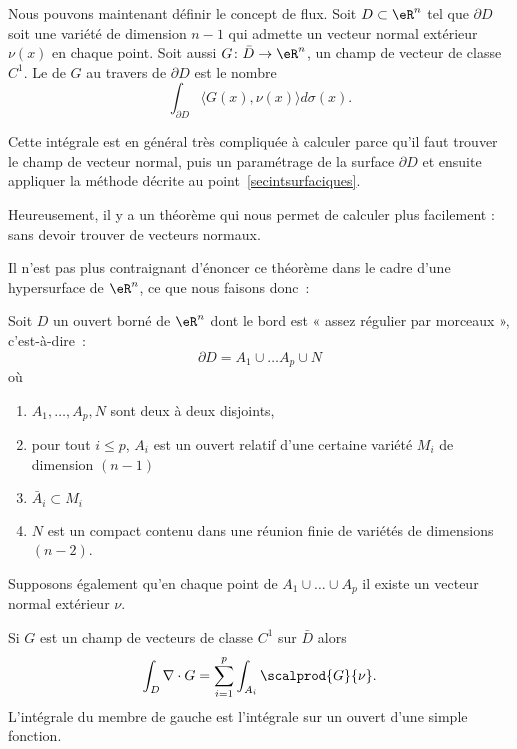 Nous pouvons maintenant définir le concept de flux. Soit \( D\subset \eR^n\) tel que \( \partial D\) soit une variété de dimension \( n-1\) qui admette un vecteur normal extérieur \( \nu(x)\) en chaque point. Soit aussi \( G\colon \bar D\to \eR^n\), un champ de vecteur de classe \( C^1\). Le  de \( G\) au travers de \( \partial D\) est le nombre
\begin{equation}
	\int_{\partial D}\langle G(x), \nu(x)\rangle d\sigma(x).
\end{equation}

Cette intégrale est en général très compliquée à calculer parce qu'il faut trouver le champ de vecteur normal, puis un paramétrage de la surface \( \partial D\) et ensuite appliquer la méthode décrite au point~\ref{secintsurfaciques}.

Heureusement, il y a un théorème qui nous permet de calculer plus facilement : sans devoir trouver de vecteurs normaux.

Il n'est pas plus contraignant d'énoncer ce théorème dans le cadre d'une hypersurface de \( \eR^n\), ce que nous faisons donc~:
\begin{theorem}
	Soit \( D\) un ouvert borné de \( \eR^n\) dont le bord est « assez régulier par morceaux », c'est-à-dire~:
	\begin{equation}
		\partial D = A_1 \cup \ldots A_p \cup N
	\end{equation}
	où
	\begin{enumerate}
		\item \( A_1, \ldots, A_p, N\) sont deux à deux disjoints,
		\item pour tout \( i \leq p\), \( A_i\) est un ouvert relatif d'une certaine variété \( M_i\) de dimension \( (n-1)\)
		\item \( \bar A_i \subset M_i\)
		\item \( N\) est un compact contenu dans une réunion finie de variétés de dimensions \( (n-2)\).
	\end{enumerate}
	Supposons également qu'en chaque point de \( A_1 \cup \ldots \cup A_p\) il existe un vecteur normal extérieur \( \nu\).

	Si \( G\) est un champ de vecteurs de classe \( C^1\) sur \( \bar D\) alors
	\begin{equation}
		\int_D \nabla\cdot G = \sum_{i=1}^p \int_{A_i} \scalprod{G}{\nu}.
	\end{equation}
	L'intégrale du membre de gauche est l'intégrale sur un ouvert d'une simple fonction.
\end{theorem}

